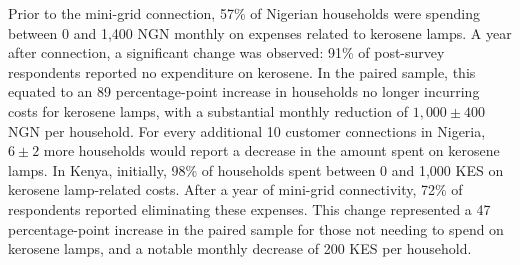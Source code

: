 Prior to the mini-grid connection, 57\% of Nigerian households were spending between 0 and 1,400 NGN monthly on expenses related to kerosene lamps. A year after connection, a significant change was observed: 91\% of post-survey respondents reported no expenditure on kerosene. In the paired sample, this equated to an 89 percentage-point increase in households no longer incurring costs for kerosene lamps, with a substantial monthly reduction of $1,000\pm400$ NGN per household. For every additional 10 customer connections in Nigeria, $6\pm2$ more households would report a decrease in the amount spent on kerosene lamps. In Kenya, initially, 98\% of households spent between 0 and 1,000 KES on kerosene lamp-related costs. After a year of mini-grid connectivity, 72\% of respondents reported eliminating these expenses. This change represented a 47 percentage-point increase in the paired sample for those not needing to spend on kerosene lamps, and a notable monthly decrease of 200 KES per household.